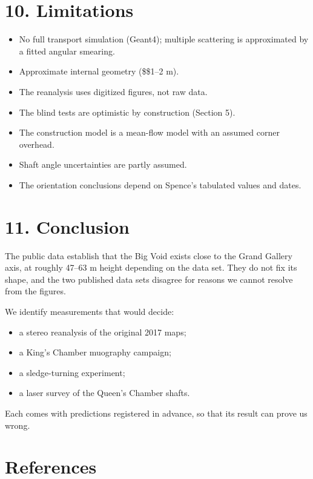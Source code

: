 \documentclass[
  11pt,
]{article}
\providecommand{\tightlist}{%
  \setlength{\itemsep}{0pt}\setlength{\parskip}{0pt}}
\begin{document}
\hypertarget{limitations}{%
\section{10. Limitations}\label{limitations}}

\begin{itemize}
\tightlist
\item
  No full transport simulation (Geant4); multiple scattering is
  approximated by a fitted angular smearing.
\item
  Approximate internal geometry (\$\pm\$1--2 m).
\item
  The reanalysis uses digitized figures, not raw data.
\item
  The blind tests are optimistic by construction (Section 5).
\item
  The construction model is a mean-flow model with an assumed corner
  overhead.
\item
  Shaft angle uncertainties are partly assumed.
\item
  The orientation conclusions depend on Spence's tabulated values and
  dates.
\end{itemize}

\hypertarget{conclusion}{%
\section{11. Conclusion}\label{conclusion}}

The public data establish that the Big Void exists close to the Grand
Gallery axis, at roughly 47--63 m height depending on the data set. They
do not fix its shape, and the two published data sets disagree for
reasons we cannot resolve from the figures.

We identify measurements that would decide:

\begin{itemize}
\tightlist
\item
  a stereo reanalysis of the original 2017 maps;
\item
  a King's Chamber muography campaign;
\item
  a sledge-turning experiment;
\item
  a laser survey of the Queen's Chamber shafts.
\end{itemize}

Each comes with predictions registered in advance, so that its result
can prove us wrong.

\hypertarget{references}{%
\section{References}\label{references}}
\end{document}
